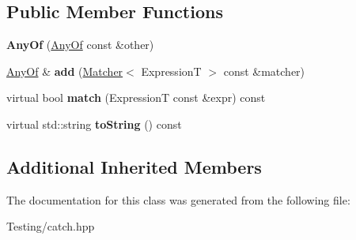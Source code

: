 \subsection*{Public Member Functions}
\begin{DoxyCompactItemize}
\item 
\hypertarget{class_catch_1_1_matchers_1_1_impl_1_1_generic_1_1_any_of_a74fbc05b32d334fcbfd0fae0163a404e}{{\bfseries Any\-Of} (\hyperlink{class_catch_1_1_matchers_1_1_impl_1_1_generic_1_1_any_of}{Any\-Of} const \&other)}\label{class_catch_1_1_matchers_1_1_impl_1_1_generic_1_1_any_of_a74fbc05b32d334fcbfd0fae0163a404e}

\item 
\hypertarget{class_catch_1_1_matchers_1_1_impl_1_1_generic_1_1_any_of_a3bce94b627551e5f96c5f9c6060413f0}{\hyperlink{class_catch_1_1_matchers_1_1_impl_1_1_generic_1_1_any_of}{Any\-Of} \& {\bfseries add} (\hyperlink{struct_catch_1_1_matchers_1_1_impl_1_1_matcher}{Matcher}$<$ Expression\-T $>$ const \&matcher)}\label{class_catch_1_1_matchers_1_1_impl_1_1_generic_1_1_any_of_a3bce94b627551e5f96c5f9c6060413f0}

\item 
\hypertarget{class_catch_1_1_matchers_1_1_impl_1_1_generic_1_1_any_of_a2f97a08338e12deba541043a57d73db9}{virtual bool {\bfseries match} (Expression\-T const \&expr) const }\label{class_catch_1_1_matchers_1_1_impl_1_1_generic_1_1_any_of_a2f97a08338e12deba541043a57d73db9}

\item 
\hypertarget{class_catch_1_1_matchers_1_1_impl_1_1_generic_1_1_any_of_a7ecc6ec08b2018a643923a9d450aa328}{virtual std\-::string {\bfseries to\-String} () const }\label{class_catch_1_1_matchers_1_1_impl_1_1_generic_1_1_any_of_a7ecc6ec08b2018a643923a9d450aa328}

\end{DoxyCompactItemize}
\subsection*{Additional Inherited Members}


The documentation for this class was generated from the following file\-:\begin{DoxyCompactItemize}
\item 
Testing/catch.\-hpp\end{DoxyCompactItemize}
